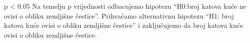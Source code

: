\documentclass[
]{article}
\newenvironment{Shaded}{\begin{snugshade}}{\end{snugshade}}
\newcommand{\AttributeTok}[1]{\textcolor[rgb]{0.77,0.63,0.00}{#1}}
\newcommand{\ConstantTok}[1]{\textcolor[rgb]{0.00,0.00,0.00}{#1}}
\newcommand{\DecValTok}[1]{\textcolor[rgb]{0.00,0.00,0.81}{#1}}
\newcommand{\FunctionTok}[1]{\textcolor[rgb]{0.00,0.00,0.00}{#1}}
\newcommand{\NormalTok}[1]{#1}
\newcommand{\OtherTok}[1]{\textcolor[rgb]{0.56,0.35,0.01}{#1}}
\newcommand{\SpecialCharTok}[1]{\textcolor[rgb]{0.00,0.00,0.00}{#1}}
\begin{document}
\begin{Shaded}
\end{Shaded}

p \textless{} 0.05 Na temelju p vrijednosti odbacujemo hipotezu
``H0:broj katova kuće ne ovisi o obliku zemljišne čestice''. Prihvaćamo
alternativnu hipotezu ``H1: broj katova kuće ovisi o obliku zemljišne
čestice'' i zaključujemo da broj katova kuće ovisi o obliku zemljišne
čestice.
\end{document}
